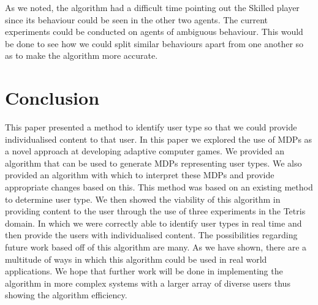 \documentclass[11pt, conference, compsoc]{IEEEtran}
\begin{document}
As we noted, the algorithm had a difficult time pointing out the Skilled player since its behaviour could be seen in the other two agents. The current experiments could be conducted on agents of ambiguous behaviour. This would be done to see how we could split similar behaviours apart from one another so as to make the algorithm more accurate.


\section{Conclusion}

This paper presented a method to identify user type so that we could provide individualised content to that user. In this paper we explored the use of MDPs as a novel approach at developing adaptive computer games. We provided an algorithm that can be used to generate MDPs representing user types. We also provided an algorithm with which to interpret these MDPs and provide appropriate changes based on this. This method was based on an existing method \cite{ramamoorthy2013latent} to determine user type.  We then showed the viability of this algorithm in providing content to the user through the use of three experiments in the Tetris domain. In which we were correctly able to identify user types in real time and then provide the users with individualised content. The possibilities regarding future work based off of this algorithm are many. As we have shown, there are a multitude of ways in which this algorithm could be used in real world applications. We hope that further work will be done in implementing the algorithm in more complex systems with a larger array of diverse users thus showing the algorithm efficiency.



\newpage


\end{document}
